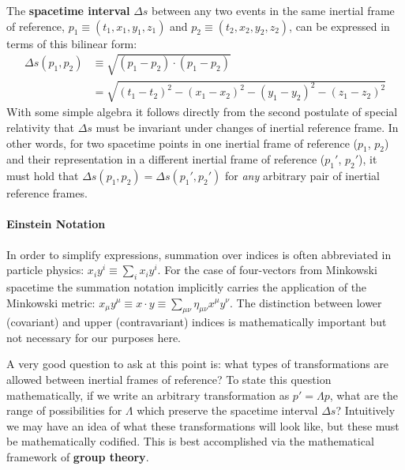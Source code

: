 The \textbf{spacetime interval} $\Delta s$ between any two events in the same inertial frame of reference, $p_1 \equiv (t_1, x_1, y_1, z_1)$ and $p_2 \equiv (t_2, x_2, y_2, z_2)$, can be expressed in terms of this bilinear form:
\begin{align*}
    \Delta s(p_1, p_2) &\equiv \sqrt{(p_1-p_2) \cdot (p_1-p_2)} \\
    &= \sqrt{
        (t_1-t_2)^2 - (x_1-x_2)^2 - (y_1 - y_2)^2 - (z_1 - z_2)^2
    }
\end{align*}
With some simple algebra it follows directly from the second postulate of special relativity that $\Delta s$ must be invariant under changes of inertial reference frame. In other words, for two spacetime points in one inertial frame of reference ($p_1$, $p_2$) and their representation in a different inertial frame of reference ($p_1'$, $p_2'$), it must hold that $\Delta s(p_1, p_2) = \Delta s(p_1', p_2')$ for \textit{any} arbitrary pair of inertial reference frames.

\begin{tcolorbox}
\paragraph{Einstein Notation} 
In order to simplify expressions, summation over indices is often abbreviated in particle physics: $x_i y^i \equiv \sum_i x_i y^i$.
For the case of four-vectors from Minkowski spacetime the summation notation implicitly carries the application of the Minkowski metric:
$x_\mu y^\mu \equiv x \cdot y \equiv \sum_{\mu\nu} \eta_{\mu\nu} x^\mu y^\nu$.
The distinction between lower (covariant) and upper (contravariant) indices is mathematically important but not necessary for our purposes here.
\end{tcolorbox}

A very good question to ask at this point is: what types of transformations are allowed between inertial frames of reference?
To state this question mathematically, if we write an arbitrary transformation as $p' = \Lambda p$, what are the range of possibilities for $\Lambda$ which preserve the spacetime interval $\Delta s$?
Intuitively we may have an idea of what these transformations will look like, but these must be mathematically codified.
This is best accomplished via the mathematical framework of \textbf{group theory}.


